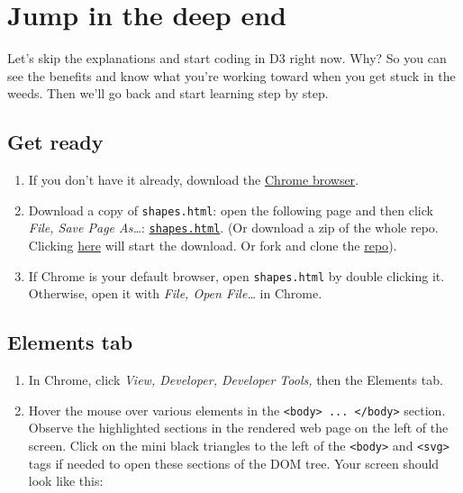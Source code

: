 \documentclass[openany]{book}
\begin{document}
\hypertarget{jump}{%
\chapter{Jump in the deep end }\label{jump}}

Let's skip the explanations and start coding in D3 right now. Why? So you can see the benefits and know what you're working toward when you get stuck in the weeds. Then we'll go back and start learning step by step.

\hypertarget{get-ready}{%
\section{Get ready }\label{get-ready}}

\begin{enumerate}
\def\labelenumi{\arabic{enumi}.}
\item
  If you don't have it already, download the \href{https://www.google.com/chrome/}{Chrome browser}.
\item
  Download a copy of \texttt{shapes.html}: open the following page and then click \emph{File, Save Page As\ldots{}}: \href{https://raw.githubusercontent.com/jtr13/d3book/master/code/shapes.html}{\texttt{shapes.html}}. (Or download a zip of the whole repo. Clicking \href{https://github.com/jtr13/d3book/archive/master.zip}{here} will start the download. Or fork and clone the \href{https://github.com/jtr13/d3book}{repo}).
\item
  If Chrome is your default browser, open \texttt{shapes.html} by double clicking it. Otherwise, open it with \emph{File, Open File\ldots{}} in Chrome.
\end{enumerate}

\hypertarget{elements-tab}{%
\section{Elements tab }\label{elements-tab}}

\begin{enumerate}
\def\labelenumi{\arabic{enumi}.}
\item
  In Chrome, click \emph{View, Developer, Developer Tools,} then the Elements tab.
\item
  Hover the mouse over various elements in the \texttt{\textless{}body\textgreater{}\ ...\ \textless{}/body\textgreater{}} section. Observe the highlighted sections in the rendered web page on the left of the screen. Click on the mini black triangles to the left of the \texttt{\textless{}body\textgreater{}} and \texttt{\textless{}svg\textgreater{}} tags if needed to open these sections of the DOM tree. Your screen should look like this:
\end{enumerate}
\end{document}
